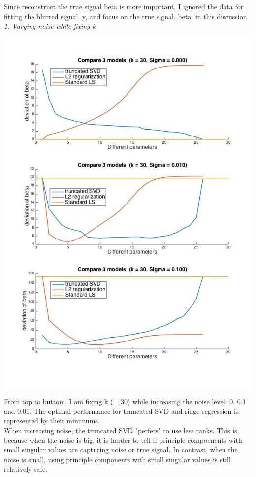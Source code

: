 \documentclass[paper=a4, fontsize=11pt]{scrartcl} %
\numberwithin{equation}{section} %
\numberwithin{figure}{section} %
\numberwithin{table}{section} %
\begin{document}
Since reconstruct the true signal beta is more important, I ignored the data for fitting the blurred signal, y, and focus on the true signal, beta, in this discussion. \\

\textit{1. Varying noise while fixing k}
\begin{center}
\includegraphics[scale=.54]{2b_varyNoise.jpg}
\end{center}

From top to buttom, I am fixing k (= 30) while increasing the noise level: 0, 0.1 and 0.01. The optimal performance for truncated SVD and ridge regression is represented by their minimums. \\ 

When increasing noise, the truncated SVD "perfers" to use less ranks. This is because when the noise is big, it is harder to tell if principle compoenents with small singular values are capturing noise or true signal. In contrast, when the noise is small, using principle components with small singular values is still relatively safe. \\
\end{document}
